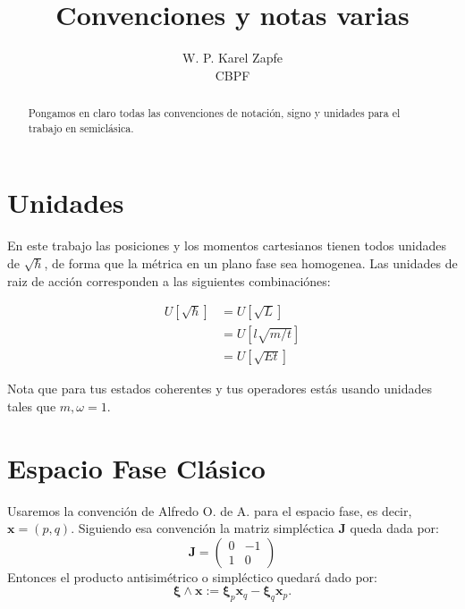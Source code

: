 \documentclass[a4paper,10pt]{article}
\title{Convenciones y notas varias}
\author{ W. P. Karel Zapfe\\CBPF}
\newcommand{\xfase}{\mathbf{x}}
\newcommand{\xifase}{ {\boldsymbol{\xi}} }
\newcommand{\Jsimp}{\mathbf{J}}
\begin{document}
\maketitle

\begin{abstract}

Pongamos en claro todas las convenciones de notación, signo
y unidades para el trabajo en semiclásica.

\end{abstract}

\section{Unidades}

En este trabajo las posiciones y los momentos cartesianos
tienen todos unidades de $\sqrt{\hbar}$, de forma
que la métrica en un plano fase sea homogenea. Las unidades
de raiz de acción corresponden a las siguientes combinaciónes:

\begin{equation}
\begin{split}
U[\sqrt \hbar] &= U[\sqrt L] \\
&=U[l \sqrt{m/t} ] \\
&=U[\sqrt{E t}]
\end{split}
\end{equation}

Nota que para tus estados coherentes y tus operadores
estás usando unidades tales que $m, \omega =1$. 

\section{Espacio Fase Clásico}

Usaremos la convención de Alfredo O. de A. para el espacio fase,
es decir, $\xfase=(p,q)$.  Siguiendo esa convención la matriz simpléctica
$\Jsimp$ queda dada por:
\begin{equation}
\Jsimp=\left( \begin{array}{cc}
0 & -1 \\
1 & 0
\end{array} \right)
\end{equation}
Entonces el producto antisimétrico o simpléctico quedará dado por:
\begin{equation}
\xifase\wedge\xfase:=\xifase_p \xfase_q -\xifase_q \xfase_p.
\end{equation}
\end{document}
